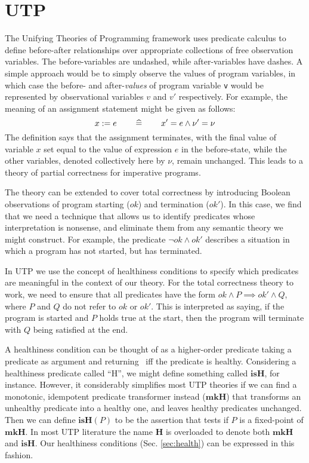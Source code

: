 \section{UTP}\label{sec:UTP}

The Unifying Theories of Programming framework \cite{Hoare-He98}
uses predicate calculus to define before-after relationships
over appropriate collections of free observation variables.
The before-variables are undashed,
while after-variables have dashes.
A simple approach would be to simply observe the values of program variables,
in which case the before- and after-\emph{values}
of program variable \texttt{v}
would be represented by observational variables $v$ and $v'$ respectively.
For example,
the meaning of an assignment statement might be given as follows:
\begin{equation*}
  x := e  \qquad\mathrel{\widehat=}\qquad  x' = e \land \nu'=\nu
\end{equation*}
The definition says that the assignment terminates,
with the final value of variable $x$ set equal
to the value of expression $e$ in the before-state,
while the other variables, denoted collectively here  by $\nu$, remain unchanged.
This leads to a theory of partial correctness for imperative programs.

The theory can be extended to cover total correctness by introducing
Boolean observations of program starting ($ok$) and termination ($ok'$).
In this case, we find that we need a technique that allows us to identify
predicates whose interpretation is nonsense, and eliminate them from any
semantic theory we might construct.
For example, the predicate $\lnot ok \land ok'$ describes a situation
in which a program has not started, but has terminated.

In UTP we use the concept of healthiness conditions to specify which predicates
are meaningful in the context of our theory.
For the total correctness theory to work,
we need to ensure that all predicates have the form
$ok \land P \implies ok' \land Q$, where $P$ and $Q$ do not refer to $ok$ or $ok'$.
This is interpreted as saying,
if the program is started and $P$ holds true at the start,
then the program will terminate with $Q$ being satisfied at the end.

A healthiness condition can be thought of as a higher-order predicate
taking a predicate as argument and returning \true\ iff the predicate is healthy.
Considering a healthiness predicate called ``H'',
we might define something called $\mathbf{isH}$, for instance.
However, it considerably simplifies most UTP theories
if we can find a monotonic, idempotent predicate transformer
instead ($\mathbf{mkH}$)
that transforms an unhealthy predicate into a healthy one,
and leaves healthy predicates unchanged.
Then we can define $\mathbf{isH}(P)$ to be the assertion that tests
if $P$ is a fixed-point of $\mathbf{mkH}$.
In most UTP literature the name $\mathbf{H}$ is overloaded
to denote both $\mathbf{mkH}$ and $\mathbf{isH}$.
Our healthiness conditions (Sec. \ref{sec:health})
can be expressed in this fashion.

